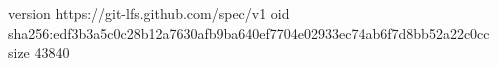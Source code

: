 version https://git-lfs.github.com/spec/v1
oid sha256:edf3b3a5c0c28b12a7630afb9ba640ef7704e02933ec74ab6f7d8bb52a22c0cc
size 43840
